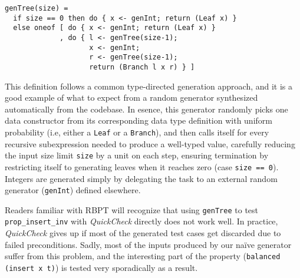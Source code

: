 \documentclass[sigconf, anonymous, review]{acmart}
\newcommand{\quickcheck}{\textit{QuickCheck}\xspace}
\begin{document}



\begin{verbatim}
genTree(size) =
  if size == 0 then do { x <- genInt; return (Leaf x) }
  else oneof [ do { x <- genInt; return (Leaf x) }
             , do { l <- genTree(size-1);
                    x <- genInt;
                    r <- genTree(size-1);
                    return (Branch l x r) } ]
\end{verbatim}

\noindent This definition follows a common type-directed generation approach,
and it is a good example of what to expect from a random generator synthesized
automatically from the codebase.
%
In esence, this generator randomly picks one data constructor from its
corresponding data type definition with uniform probability (i.e, either a
\texttt{Leaf} or a \texttt{Branch}), and then calls itself for every recursive
subexpression needed to produce a well-typed value, carefully reducing the input
size limit \texttt{size} by a unit on each step, ensuring termination by
restricting itself to generating leaves when it reaches zero (case \texttt{size
  == 0}).
%
Integers are generated simply by delegating the task to an external random
generator (\texttt{genInt}) defined elsewhere.
%


Readers familiar with RBPT will recognize that using \texttt{genTree} to test
\texttt{prop\_insert\_inv} with \quickcheck directly does not work well.
%
In practice, \quickcheck gives up if most of the generated test cases get
discarded due to failed preconditions.
%
%
Sadly, most of the inputs produced by our na\"ive generator suffer from this
problem, and the interesting part of the property (\texttt{balanced (insert x
  t)}) is tested very sporadically as a result.
\end{document}
